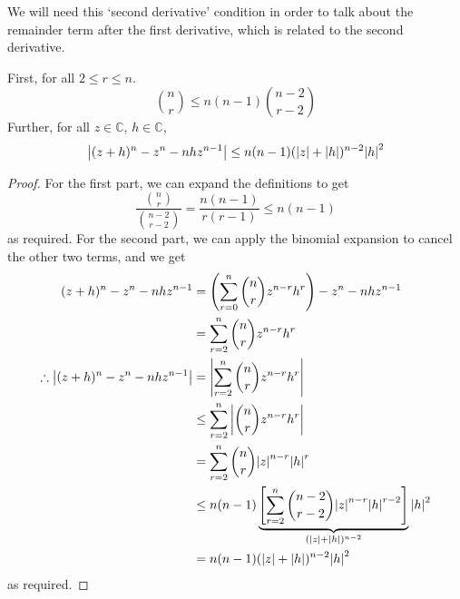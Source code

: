 \documentclass{article}
\begin{document}
\noindent We will need this `second derivative' condition in order to talk about the remainder term after the first derivative, which is related to the second derivative.
\begin{lemma}
    First, for all $2 \leq r \leq n$.
    \[ \binom{n}{r} \leq n(n-1)\binom{n-2}{r-2} \]
    Further, for all $z \in \mathbb C$, $h \in \mathbb C$,
    \[ \abs{(z + h)^n - z^n - nhz^{n-1}} \leq n(n-1)(\abs{z} + \abs{h})^{n-2}\abs{h}^2 \]
\end{lemma}
\begin{proof}
    For the first part, we can expand the definitions to get
    \[ \frac{\binom{n}{r}}{\binom{n-2}{r-2}} = \frac{n(n-1)}{r(r-1)} \leq n(n-1) \]
    as required. For the second part, we can apply the binomial expansion to cancel the other two terms, and we get
    \begin{align*}
        (z + h)^n - z^n - nhz^{n-1}                  & = \left( \sum_{r=0}^n \binom{n}{r} z^{n-r} h^r \right)  - z^n - nhz^{n-1}                                                               \\
                                                     & = \sum_{r=2}^n \binom{n}{r} z^{n-r} h^r                                                                                                 \\
        \therefore \abs{(z + h)^n - z^n - nhz^{n-1}} & = \abs{\sum_{r=2}^n \binom{n}{r} z^{n-r} h^r}                                                                                           \\
                                                     & \leq \sum_{r=2}^n \abs{\binom{n}{r} z^{n-r} h^r}                                                                                        \\
                                                     & = \sum_{r=2}^n \binom{n}{r} \abs{z}^{n-r} \abs{h}^r                                                                                     \\
                                                     & \leq n(n-1) \underbrace{\left[ \sum_{r=2}^n \binom{n-2}{r-2} \abs{z}^{n-r} \abs{h}^{r-2} \right]}_{(\abs{z} + \abs{h})^{n-2}} \abs{h}^2 \\
                                                     & = n(n-1) (\abs{z} + \abs{h})^{n-2} \abs{h}^2                                                                                            \\
    \end{align*}
    as required.
\end{proof}
\end{document}
